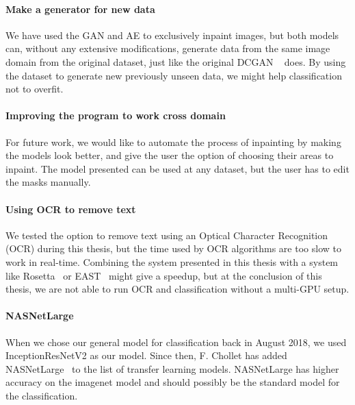 
\paragraph{Make a generator for new data}
We have used the GAN and AE to exclusively inpaint images, but both models can, without any extensive modifications,  generate data from the same image domain from the original dataset, just like the original DCGAN ~\cite{DBLP:journals/corr/RadfordMC15} does.  
By using the dataset to generate new previously unseen data, we might help classification not to overfit.

\paragraph{Improving the program to work cross domain}
For future work, we would like to automate the process of inpainting by making the models look better, and give the user the option of choosing their areas to inpaint. The model presented can be used at any dataset, but the user has to edit the masks manually. 

\paragraph{Using OCR to remove text}
We tested the option to remove text using an Optical Character Recognition (OCR) during this thesis, but the time used by OCR algorithms are too slow to work in real-time. Combining the system presented in this thesis with a system like Rosetta~\cite{borisyuk2018rosetta} or EAST~\cite{DBLP:journals/corr/ZhouYWWZHL17} might give a speedup, but at the conclusion of this thesis, we are not able to run OCR and classification without a multi-GPU setup.


\paragraph{NASNetLarge}
When we chose our general model for classification back in August 2018, we used InceptionResNetV2 as our model. Since then, F. Chollet has added NASNetLarge~\cite{DBLP:journals/corr/ZophVSL17} to the list of transfer learning models. NASNetLarge has higher accuracy on the imagenet model and should possibly be the standard model for the classification.


